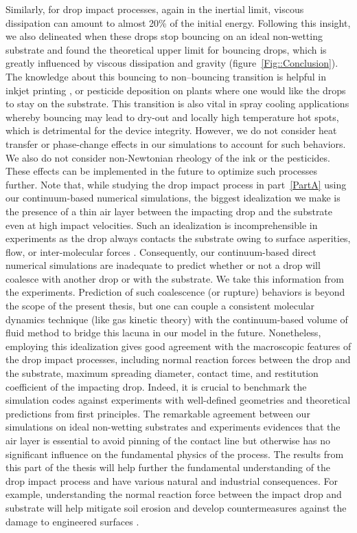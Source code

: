 Similarly, for drop impact processes, again in the inertial limit, viscous dissipation can amount to almost 20\% of the initial energy. Following this insight, we also delineated when these drops stop bouncing on an ideal non-wetting substrate and found the theoretical upper limit for bouncing drops, which is greatly influenced by viscous dissipation and gravity (figure~\ref{Fig::Conclusion}). The knowledge about this bouncing to non--bouncing transition is helpful in inkjet printing \citep{lohse2022fundamental}, or pesticide deposition on plants \cite{he2021optimization, hoffman2021controlling} where one would like the drops to stay on the substrate. This transition is also vital in spray cooling applications \citep{kim2007spray, shiri2017heat} whereby bouncing may lead to dry-out and locally high temperature hot spots, which is detrimental for the device integrity. However, we do not consider heat transfer or phase-change effects in our simulations to account for such behaviors. We also do not consider non-Newtonian rheology of the ink or the pesticides. These effects can be implemented in the future to optimize such processes further. Note that, while studying the drop impact process in part~\ref{PartA} using our continuum-based numerical simulations, the biggest idealization we make is the presence of a thin air layer between the impacting drop and the substrate even at high impact velocities. Such an idealization is incomprehensible in experiments as the drop always contacts the substrate owing to surface asperities, flow, or inter-molecular forces \citep{kolinski2014drops, SprittlesPhysRevLett.124.084501, kim2020raindrop, lohse-2020-pnas}. Consequently, our continuum-based direct numerical simulations are inadequate to predict whether or not a drop will coalesce with another drop or with the substrate. We take this information from the experiments. Prediction of such coalescence (or rupture) behaviors is beyond the scope of the present thesis, but one can couple a consistent molecular dynamics technique (like gas kinetic theory) with the continuum-based volume of fluid method to bridge this lacuna in our model in the future. Nonetheless, employing this idealization gives good agreement with the macroscopic features of the drop impact processes, including normal reaction forces between the drop and the substrate, maximum spreading diameter, contact time, and restitution coefficient of the impacting drop. Indeed, it is crucial to benchmark the simulation codes against experiments with well-defined geometries and theoretical predictions from first principles. The remarkable agreement between our simulations on ideal non-wetting substrates and experiments evidences that the air layer is essential to avoid pinning of the contact line but otherwise has no significant influence on the fundamental physics of the process. The results from this part of the thesis will help further the fundamental understanding of the drop impact process and have various natural and industrial consequences. For example, understanding the normal reaction force between the impact drop and substrate will help mitigate soil erosion \cite{nearing1986} and develop countermeasures against the damage to engineered surfaces \cite{ahmad2013, amirzadeh2017, gohardani2011}.

